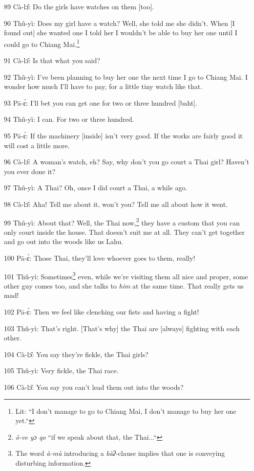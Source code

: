 89 Cà-lɔ̂: Do the girls have watches on them [too].

90 Thû-yì: Does my girl have a watch? Well, she told me she didn't. When [I found
out] she wanted one I told her I wouldn't be able to buy her one until I could
go to Chiang Mai.\footnote{Lit: ``I don't manage to go to Chiang Mai, I don't manage to buy her one yet.``}

91 Cà-lɔ̂: Is that what you said?

92 Thû-yì: I've been planning to buy her one the next time I go to Chiang Mai.
I wonder how much I'll have to pay, for a little tiny watch like that.

93 Pā-ɛ́: I'll bet you can get one for two or three hundred [baht].

94 Thû-yì: I can. For two or three hundred.

95 Pā-ɛ́: If the machinery [inside] isn't very good. If the works are fairly
good it will cost a little more.

96 Cà-lɔ̂: A woman's watch, eh? Say, why don't you go court a Thai girl? Haven't
you ever done it?

97 Thû-yì: A Thai? Oh, once I did court a Thai, a while ago.

98 Cà-lɔ̂: Aha! Tell me about it, won't you? Tell me all about how it went.

99 Thû-yì: About that? Well, the Thai now,\footnote{\textit{ô-ve yɔ qo} ``if we speak about that, the Thai...``} they have a custom that you can
only court inside the house. That doesn't suit me at all. They can't get together
and go out into the woods like us Lahu.

100 Pā-ɛ́: Those Thai, they'll love whoever goes to them, really!

101 Thû-yì: Sometimes\footnote{The word \textit{à-mù} introducing a \textit{kàʔ}-clause implies that one is conveying disturbing information.} even, while we're visiting them all nice and proper,
some other guy comes too, and she talks to \textit{him} at the same time. That
really gets us mad!

102 Pā-ɛ́: Then we feel like clenching our fists and having a fight!

103 Thû-yì: That's right. [That's why] the Thai are [always] fighting with each
other.

104 Cà-lɔ̂: You say they're fickle, the Thai girls?

105 Thû-yì: Very fickle, the Thai race.

106 Cà-lɔ̂: You say you can't lead them out into the woods?

